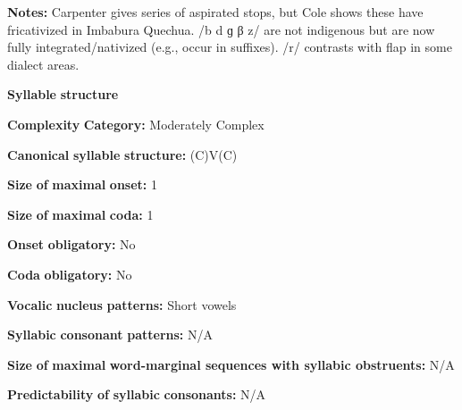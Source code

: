 \begin{styleBody}
\textbf{Notes:} Carpenter gives series of aspirated stops, but Cole shows these have fricativized in Imbabura Quechua. /b d ɡ β z/ are not indigenous but are now fully integrated/nativized (e.g., occur in suffixes). /r/ contrasts with flap in some dialect areas.
\end{styleBody}

\begin{styleBody}
\textbf{Syllable} \textbf{structure}
\end{styleBody}

\begin{styleBody}
\textbf{Complexity} \textbf{Category:} Moderately Complex
\end{styleBody}

\begin{styleBody}
\textbf{Canonical} \textbf{syllable} \textbf{structure:} (C)V(C) \citep[203-5]{Cole1982}
\end{styleBody}

\begin{styleBody}
\textbf{Size} \textbf{of} \textbf{maximal} \textbf{onset:} 1
\end{styleBody}

\begin{styleBody}
\textbf{Size} \textbf{of} \textbf{maximal} \textbf{coda:} 1
\end{styleBody}

\begin{styleBody}
\textbf{Onset} \textbf{obligatory:} No
\end{styleBody}

\begin{styleBody}
\textbf{Coda} \textbf{obligatory:} No
\end{styleBody}

\begin{styleBody}
\textbf{Vocalic} \textbf{nucleus} \textbf{patterns:} Short vowels
\end{styleBody}

\begin{styleBody}
\textbf{Syllabic} \textbf{consonant} \textbf{patterns:} N/A
\end{styleBody}

\begin{styleBody}
\textbf{Size} \textbf{of} \textbf{maximal} \textbf{word{}-marginal sequences with syllabic obstruents:} N/A
\end{styleBody}

\begin{styleBody}
\textbf{Predictability} \textbf{of} \textbf{syllabic} \textbf{consonants:} N/A
\end{styleBody}

